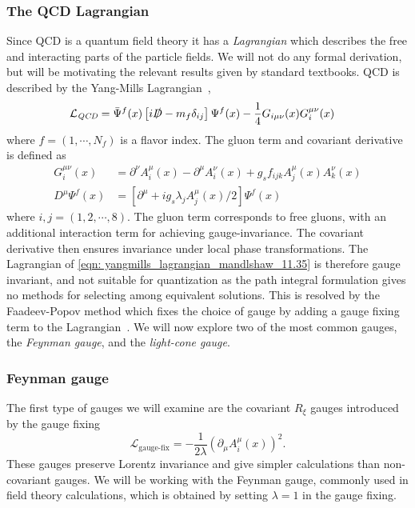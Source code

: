\documentclass[main.tex]{subfiles}
\begin{document}
\subsubsection*{The QCD Lagrangian}
Since QCD is a quantum field theory it has a \emph{Lagrangian} which describes the free and interacting parts of the particle fields. We will not do any formal derivation, but will be motivating the relevant results given by standard textbooks. QCD is described by the Yang-Mills Lagrangian~\cite{Peskin:1995ev},
\begin{align}\label{eqn: yangmills_lagrangian_mandlshaw_11.35}
    \mathcal{L}_{\textit{QCD}} &= \bar \Psi^f(x) \left[ i \slashed D -m_f \delta_{ij}\right] \Psi^f(x) - \frac{1}{4} G_{i\mu\nu}(x)G_{i}^{\mu\nu}(x)
\end{align}
where \(f = (1,\cdots, N_f)\) is a flavor index. The gluon term and covariant derivative is defined as 
\begin{align}
    G_i^{\mu\nu}(x) &= \partial^\nu A_i^\mu(x) - \partial^\mu A_i^\nu(x) + g_s f_{ijk}A_j^\mu(x)A_k^\nu(x) \\
    D^\mu \Psi^f(x) &= \left[\partial^\mu + ig_s \lambda_j A_j^\mu(x)/2 \right]\Psi^f(x)
\end{align}
where \(i,j = (1,2,\cdots,8)\). The gluon term corresponds to free gluons, with an additional interaction term for achieving gauge-invariance. The covariant derivative then ensures invariance under local phase transformations. The Lagrangian of \autoref{eqn: yangmills_lagrangian_mandlshaw_11.35} is therefore gauge invariant, and not suitable for quantization as the path integral formulation gives no methods for selecting among equivalent solutions. This is resolved by the Faadeev-Popov method which fixes the choice of gauge by adding a gauge fixing term to the Lagrangian~\cite{mandl2010quantum}. We will now explore two of the most common gauges, the \emph{Feynman gauge}, and the \emph{light-cone gauge}.

\subsubsection*{Feynman gauge}
The first type of gauges we will examine are the covariant \(R_\xi\) gauges introduced by the gauge fixing
\begin{equation}\label{eqn: gauge_fixing_Rxi}
    \mathcal{L}_{\text{gauge-fix}} = -\frac{1}{2\lambda} \left(\partial_\mu A_i^\mu(x)\right)^2.
\end{equation}
These gauges preserve Lorentz invariance and give simpler calculations than non-covariant gauges. We will be working with the Feynman gauge, commonly used in field theory calculations, which is obtained by setting \(\lambda =1\) in the gauge fixing.
\end{document}
